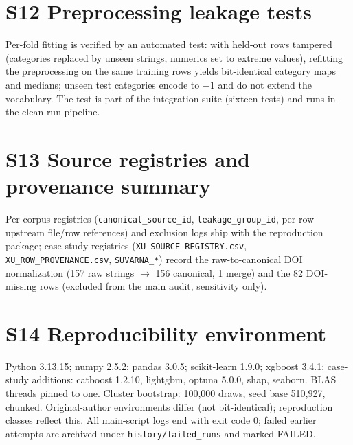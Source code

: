 \documentclass[11pt,a4paper]{article}
\begin{document}
\section{S12 Preprocessing leakage tests}
Per-fold fitting is verified by an automated test: with held-out rows tampered
(categories replaced by unseen strings, numerics set to extreme values), refitting the
preprocessing on the same training rows yields bit-identical category maps and medians;
unseen test categories encode to $-1$ and do not extend the vocabulary. The test is part
of the integration suite (sixteen tests) and runs in the clean-run pipeline.

\section{S13 Source registries and provenance summary}
Per-corpus registries (\texttt{canonical\_source\_id}, \texttt{leakage\_group\_id},
per-row upstream file/row references) and exclusion logs ship with the reproduction
package; case-study registries (\texttt{XU\_SOURCE\_REGISTRY.csv},
\texttt{XU\_ROW\_PROVENANCE.csv}, \texttt{SUVARNA\_*}) record the raw-to-canonical DOI
normalization (157 raw strings $\to$ 156 canonical, 1 merge) and the 82 DOI-missing rows
(excluded from the main audit, sensitivity only).

\section{S14 Reproducibility environment}
Python 3.13.15; numpy 2.5.2; pandas 3.0.5; scikit-learn 1.9.0; xgboost 3.4.1;
case-study additions: catboost 1.2.10, lightgbm, optuna 5.0.0, shap, seaborn. BLAS
threads pinned to one. Cluster bootstrap: 100{,}000 draws, seed base 510{,}927,
chunked. Original-author environments differ (not bit-identical); reproduction classes
reflect this. All main-script logs end with exit code 0; failed earlier attempts are
archived under \texttt{history/failed\_runs} and marked FAILED.
\end{document}
